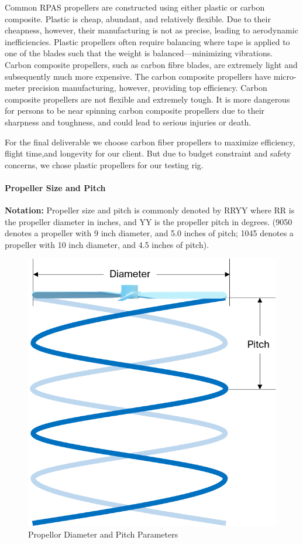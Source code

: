 Common RPAS propellers are constructed using either plastic or carbon composite. Plastic is cheap, abundant, 
and relatively flexible. Due to their cheapness, however, their manufacturing is not as precise, leading to 
aerodynamic inefficiencies. Plastic propellers often require balancing where tape is applied to one of the 
blades such that the weight is balanced---minimizing vibrations. Carbon composite propellers, such as 
carbon fibre blades, are extremely light and subsequently much more expensive. The carbon composite 
propellers have micro-meter precision manufacturing, however, providing top efficiency. Carbon composite 
propellers are not flexible and extremely tough. It is more dangerous for persons to be near spinning 
carbon composite propellers due to their sharpness and toughness, and could lead to serious injuries or death.

For the final deliverable we choose carbon fiber propellers to maximize efficiency, flight time,and longevity for our client. But due to budget constraint and safety concerns, we chose plastic propellers for our testing rig.

\paragraph{Propeller Size and Pitch}

\textbf{Notation: } Propeller size and pitch is commonly denoted by RRYY where RR is the propeller diameter in inches, and YY is the propeller pitch in degrees. (9050 denotes a propeller with 9 inch diameter, and 5.0 inches of pitch; 1045 denotes a propeller with 10 inch diameter, and 4.5 inches of pitch).

\begin{figure}[h]
    \centering
    \includegraphics[scale=0.5]{img/proppitch}
    \caption{Propellor Diameter and Pitch Parameters}
    \label{fig:propeller}
\end{figure}

